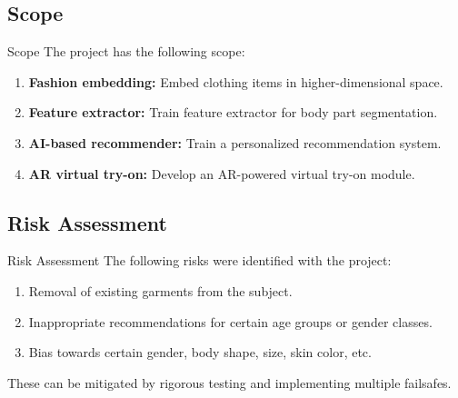 \subsection{Scope}
\begin{frame}{Scope}
	The project has the following scope:
	\begin{enumerate}
		\item \textbf{Fashion embedding:} Embed clothing items in higher-dimensional space.
		\item \textbf{Feature extractor:} Train feature extractor for body part segmentation.
		\item \textbf{AI-based recommender:} Train a personalized recommendation system.
		\item \textbf{AR virtual try-on:} Develop an AR-powered virtual try-on module.
	\end{enumerate}
\end{frame}

\subsection{Risk Assessment}
\begin{frame}{Risk Assessment}
	The following risks were identified with the project:
	\begin{enumerate}
		\item Removal of existing garments from the subject.
		\item Inappropriate recommendations for certain age groups or gender classes.
		\item Bias towards certain gender, body shape, size, skin color, etc.
	\end{enumerate}
	These can be mitigated by rigorous testing and implementing multiple failsafes.
\end{frame}
